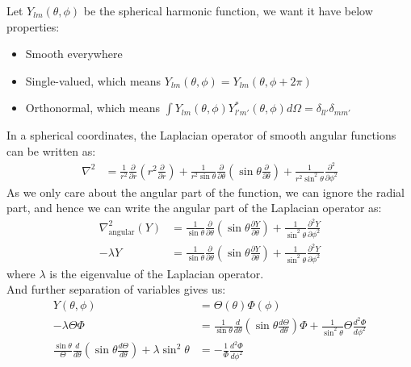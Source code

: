\bigskip \noindent
\begin{foundation}
    Let $Y_{lm}(\theta, \phi)$ be the spherical harmonic function, we want it have below properties:
    \begin{itemize}
        \item Smooth everywhere 
        \item Single-valued, which means $Y_{lm}(\theta, \phi) = Y_{lm}(\theta, \phi + 2\pi)$
        \item Orthonormal, which means $\int Y_{lm}(\theta, \phi) Y_{l'm'}^*(\theta, \phi) d\Omega = \delta_{ll'} \delta_{mm'}$
    \end{itemize} 
    
    In a spherical coordinates, the Laplacian operator of smooth angular functions can be written as:
    \begin{align*}
        \nabla^2 &= \frac{1}{r^2} \frac{\partial}{\partial r} \left( r^2 \frac{\partial}{\partial r} \right) + \frac{1}{r^2 \sin \theta} \frac{\partial}{\partial \theta} \left( \sin \theta \frac{\partial}{\partial \theta} \right) + \frac{1}{r^2 \sin^2 \theta} \frac{\partial^2}{\partial \phi^2}
    \end{align*}
    As we only care about the angular part of the function, we can ignore the radial part, and hence we can write the angular part of the Laplacian operator as:
    \begin{align*}
        \nabla^2_{\text{angular}}(Y) &= \frac{1}{\sin \theta} \frac{\partial}{\partial \theta} \left( \sin \theta \frac{\partial Y}{\partial \theta} \right) + \frac{1}{\sin^2 \theta} \frac{\partial^2 Y}{\partial \phi^2} \\
        - \lambda Y &= \frac{1}{\sin \theta} \frac{\partial}{\partial \theta} \left( \sin \theta \frac{\partial Y}{\partial \theta} \right) + \frac{1}{\sin^2 \theta} \frac{\partial^2 Y}{\partial \phi^2}
    \end{align*}
    where $\lambda$ is the eigenvalue of the Laplacian operator.  \\
    And further separation of variables gives us:
    \begin{align*}
        Y(\theta, \phi) &= \Theta(\theta) \Phi(\phi) \\
        -\lambda \Theta \Phi &= \frac{1}{\sin \theta} \frac{d}{d\theta} \left( \sin \theta \frac{d\Theta}{d\theta} \right) \Phi + \frac{1}{\sin^2 \theta} \Theta \frac{d^2\Phi}{d\phi^2} \\
        \frac{\sin \theta}{\Theta} \frac{d}{d\theta} \left( \sin \theta \frac{d\Theta}{d\theta} \right) + \lambda \sin^2 \theta &= -\frac{1}{\Phi} \frac{d^2\Phi}{d\phi^2}

\end{align*}
\end{foundation}
